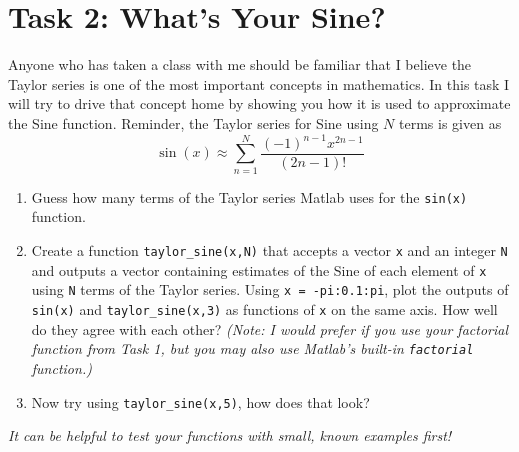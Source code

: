 \documentclass[11pt]{article}
\begin{document}
	\section*{Task 2: What's Your Sine?}
	\noindent Anyone who has taken a class with me should be familiar that I believe the Taylor series is one of the most important concepts in mathematics. In this task I will try to drive that concept home by showing you how it is used to approximate the Sine function. Reminder, the Taylor series for Sine using $N$ terms is given as 
	\begin{equation*}
		\sin(x) \approx \sum_{n=1}^{N}\frac{(-1)^{n-1} x^{2n-1}}{(2n-1)!}
	\end{equation*}
	\begin{enumerate}[label=\alph*)]
		\item Guess how many terms of the Taylor series Matlab uses for the \texttt{sin(x)} function.
		\item Create a function \texttt{taylor\_sine(x,N)} that accepts a vector \texttt{x} and an integer \texttt{N} and outputs a vector containing estimates of the Sine of each element of \texttt{x} using \texttt{N} terms of the Taylor series. Using \texttt{x = -pi:0.1:pi}, plot the outputs of \texttt{sin(x)} and \texttt{taylor\_sine(x,3)} as functions of \texttt{x} on the same axis. How well do they agree with each other? \textit{(Note: I would prefer if you use your factorial function from Task 1, but you may also use Matlab's built-in \texttt{factorial} function.)}
		\item Now try using \texttt{taylor\_sine(x,5)}, how does that look?
	\end{enumerate}
	

	\begin{center}
		\vfill
		\textit{It can be helpful to test your functions with small, known examples first!}
	\end{center}
\end{document}
